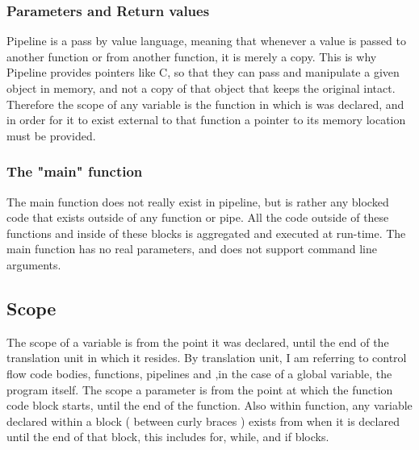 \documentclass[./LRM_main.tex]{subfiles}
\begin{document}
\subsubsection{Parameters and Return values}
Pipeline is a pass by value language, meaning that whenever a value is passed to another function or from another function, it is merely a copy. This is why Pipeline provides pointers like C, so that they can pass and manipulate a given object in memory, and not a copy of that object that keeps the original intact. Therefore the scope of any variable is the function in which is was declared, and in order for it to exist external to that function a pointer to its memory location must be provided.
\subsubsection{The "main" function}
The main function does not really exist in pipeline, but is rather any blocked code that exists outside of any function or pipe. All the code outside of these functions and inside of these blocks is aggregated and executed at run-time. The main function has no real parameters, and does not support command line arguments.
\subsection{Scope}
The scope of a variable is from the point it was declared, until the end of the translation unit in which it resides. By translation unit, I am referring to control flow code bodies, functions, pipelines and ,in the case of a global variable, the program itself. The scope a parameter is from the point at which the function code block starts, until the end of the function. Also within function, any variable declared within a block ( between curly braces ) exists from when it is declared until the end of that block, this includes for, while, and if blocks.
\end{document}
